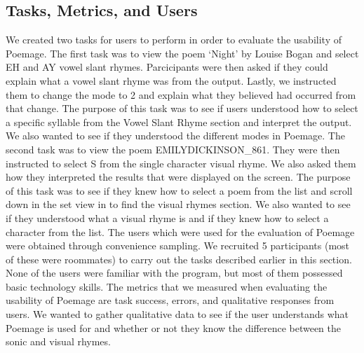 \documentclass[journal]{vgtc}                %
\begin{document}
\subsection{Tasks, Metrics, and Users}
We created two tasks for users to perform in order to evaluate the usability of Poemage. 
The first task was to view the poem ‘Night’ by Louise Bogan and select EH and AY vowel slant rhymes. 
Parcicipants were then asked if they could explain what a vowel slant rhyme was from the output. 
Lastly, we instructed them to change the mode to 2 and explain what they believed had occurred from that change. 
The purpose of this task was to see if users understood how to select a specific syllable from the Vowel Slant Rhyme section and interpret the output. 
We also wanted to see if they understood the different modes in Poemage.\break 
\indent The second task was to view the poem EMILYDICKINSON\_861. 
They were then instructed to select S from the single character visual rhyme. 
We also asked them how they interpreted the results that were displayed on the screen. 
The purpose of this task was to see if they knew how to select a poem from the list and scroll down in the set view in to find the visual rhymes section. 
We also wanted to see if they understood what a visual rhyme is and if they knew how to select a character from the list.\break
\indent The users which were used for the evaluation of Poemage were obtained through convenience sampling. 
We recruited 5 participants (most of these were roommates) to carry out the tasks described earlier in this section. 
None of the users were familiar with the program, but most of them possessed basic technology skills.\break 
\indent The metrics that we measured when evaluating the usability of Poemage are task success, errors, and qualitative responses from users. 
We wanted to gather qualitative data to see if the user understands what Poemage is used for and whether or not they know the difference between the sonic and visual rhymes.
\end{document}
